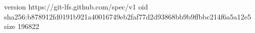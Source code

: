version https://git-lfs.github.com/spec/v1
oid sha256:b878912fd0191b921a40016749eb2faf77d2d93868bb9b9ffbbc214f6a5a12e5
size 196822
